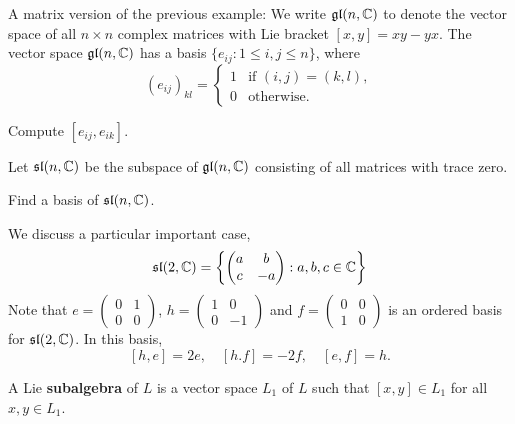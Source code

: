 A matrix version of the previous example: We write $\mathfrak{gl}(n,\mathbb{C})$ 
to denote the vector space of all $n\times n$ complex 
matrices with Lie bracket $[x,y]=xy-yx$. The vector space
$\mathfrak{gl}(n,\mathbb{C})$ has a basis $\{e_{ij}:1\leq i,j\leq n\}$, where
\[
(e_{ij})_{kl}=\begin{cases} 
    1 & \text{if $(i,j)=(k,l)$},\\
    0 & \text{otherwise}.
    \end{cases}
\]

\begin{exercise}
    Compute $[e_{ij},e_{ik}]$.
\end{exercise}

\begin{example}
    Let $\mathfrak{sl}(n,\mathbb{C})$ be the subspace of $\mathfrak{gl}(n,\mathbb{C})$ consisting
    of all matrices with trace zero. 
\end{example}

\begin{exercise}
    Find a basis of $\mathfrak{sl}(n,\mathbb{C})$. 
\end{exercise}

We discuss a particular important case,
\[
\mathfrak{sl}(2,\mathbb{C})=\left\{\begin{pmatrix}
    a & b\\
    c & -a
    \end{pmatrix}:a,b,c\in\mathbb{C}\right\}
\]
Note that 
$e=\begin{pmatrix}
        0&1\\
        0&0\end{pmatrix}$, $h=\begin{pmatrix}
        1&0\\
        0&-1\end{pmatrix}$ and $f=\begin{pmatrix}0&0\\1&0\end{pmatrix}$ 
        is an ordered basis for $\mathfrak{sl}(2,\mathbb{C})$. In this basis,
\[
[h,e]=2e,\quad
[h.f]=-2f,\quad
[e,f]=h.
\]


\begin{definition}
    A Lie \textbf{subalgebra} of $L$ is a vector space $L_1$ of $L$ 
    such that $[x,y]\in L_1$ for all $x,y\in L_1$. 
\end{definition}

